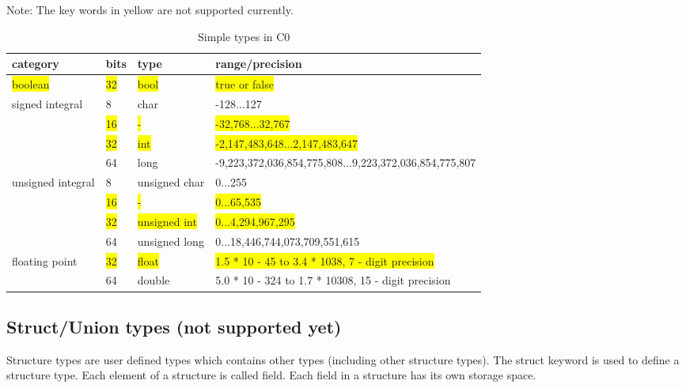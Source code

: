 \documentclass[a4paper]{article}
\begin{document}
\begin{table}[htbp]
\centering
\caption{Simple types in C0}
\begin{tablenotes}
\small
\centering
\item Note: The key words in yellow are not supported currently.
\end{tablenotes}
\begin{tabular}{|l|l|l|l|}
\hline
category & bits & type & range/precision\\
\hline
\colorbox{yellow}{boolean} & \colorbox{yellow}{32} & \colorbox{yellow}{bool} & \colorbox{yellow}{true or false}\\
\hline
\multirow{4}{*}{signed integral} & 8 & char & -128...127\\\cline{2-4}
 & \colorbox{yellow}{16} & \colorbox{yellow}{-} & \colorbox{yellow}{-32,768...32,767}\\\cline{2-4}
 & \colorbox{yellow}{32} & \colorbox{yellow}{int} & \colorbox{yellow}{-2,147,483,648...2,147,483,647}\\\cline{2-4}
 & 64 & long & -9,223,372,036,854,775,808...9,223,372,036,854,775,807\\\cline{2-4} \hline
\multirow{4}{*}{unsigned integral} & 8 & unsigned char & 0...255\\\cline{2-4}
 & \colorbox{yellow}{16} & \colorbox{yellow}{-} & \colorbox{yellow}{0...65,535}\\\cline{2-4}
 & \colorbox{yellow}{32} & \colorbox{yellow}{unsigned int} & \colorbox{yellow}{0...4,294,967,295}\\\cline{2-4}
 & 64 & unsigned long & 0...18,446,744,073,709,551,615\\\cline{2-4} \hline
\multirow{2}{*}{floating point} & \colorbox{yellow}{32} & \colorbox{yellow}{float} & \colorbox{yellow}{1.5 * 10 - 45 to 3.4 * 1038, 7 - digit precision}\\\cline{2-4}
 & 64 & double & 5.0 * 10 - 324 to 1.7 * 10308, 15 - digit precision\\\cline{2-4} \hline
\end{tabular}
\label{table:c0-types}
\end{table}

{\subsection{Struct/Union types (not supported yet)}}

Structure types are user defined types which contains other types (including other structure types).  The struct keyword is used to define a structure type. Each element of a structure is called field. Each field in a structure has its own storage space.
\end{document}

